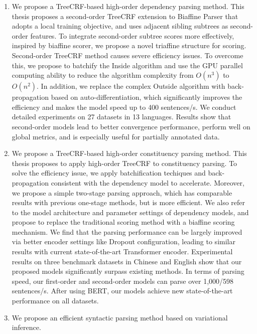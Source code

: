 \begin{eabstract}
  \begin{enumerate}
    \item We propose a TreeCRF-based high-order dependency parsing method.
          This thesis proposes a second-order TreeCRF extension to Biaffine Parser that adopts a local training objective, and uses adjacent sibling subtrees as second-order features.
          To integrate second-order subtree scores more effectively, inspired by biaffine scorer, we propose a novel triaffine structure for scoring.
          Second-order TreeCRF method causes severe efficiency issues.
          To overcome this, we propose to batchify the Inside algorithm and use the GPU parallel computing ability to reduce the algorithm complexity from $O(n^3)$ to $O(n^2)$.
          In addition, we replace the complex Outside algorithm with back-propagation based on auto-differentiation, which significantly improves the efficiency and makes the model speed up to 400 sentences/s.
          We conduct detailed experiments on 27 datasets in 13 languages.
          Results show that second-order models lead to better convergence performance, perform well on global metrics, and is especially useful for partially annotated data.
    \item We propose a TreeCRF-based high-order constituency parsing method.
          This thesis proposes to apply high-order TreeCRF to constituency parsing.
          To solve the efficiency issue, we apply batchification techiques and back-propagation consistent with the dependency model to accelerate.
          Moreover, we propose a simple two-stage parsing approach, which has comparable results with previous one-stage methods, but is more efficient.
          We also refer to the model architecture and parameter settings of dependency models, and propose to replace the traditional scoring method with a biaffine scoring mechanism.
          We find that the parsing performance can be largely improved via better encoder settings like Dropout configuration, leading to similar results with current state-of-the-art Transformer encoder.
          Experimental results on three benchmark datasets in Chinese and English show that our proposed models significantly surpass existing methods.
          In terms of parsing speed, our first-order and second-order models can parse over 1,000/598 sentences/s.
          After using BERT, our models achieve new state-of-the-art performance on all datasets.
    \item We propose an efficient syntactic parsing method based on variational inference.

\end{enumerate}
\end{eabstract}
